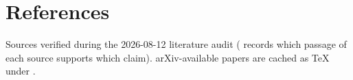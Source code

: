 %
%
\section*{References}

Sources verified during the 2026-08-12 literature audit
( records which passage of each source supports
which claim). arXiv-available papers are cached as \TeX{} under
.

